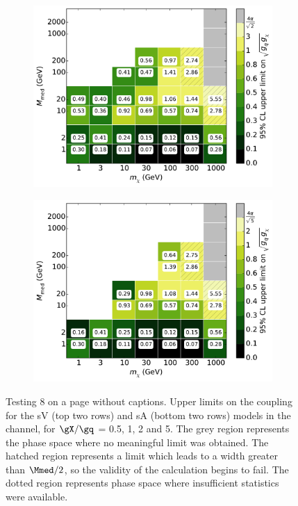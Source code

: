 \begin{figure}[h]
\begin{subfigure}[t]{0.495\textwidth}
      \includegraphics[width=1.\textwidth]{figures/grid_allpoints_SAD_rat2.pdf}
    \end{subfigure}
    \begin{subfigure}[t]{0.495\textwidth}
      \centering
      \includegraphics[width=1.\textwidth]{figures/grid_allpoints_SAD_rat5.pdf}
    \end{subfigure}
    \caption{Testing 8 on a page without captions. Upper limits on the coupling for the sV (top two rows) and sA (bottom two rows) models in the \monoZ channel, for $\gX / \gq$ = 0.5, 1, 2 and 5. The grey region represents the phase space where no meaningful limit was obtained. The hatched region represents a limit which leads to a width greater than $\Mmed / 2$, so the validity of the calculation begins to fail. The dotted region represents phase space where insufficient statistics were available.}
\end{figure}
